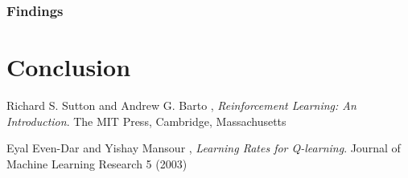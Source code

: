 \documentclass[11pt]{article}
\begin{document}
\subsubsection{Findings}

\section{Conclusion}

\begin{thebibliography}{9}

  Richard S. Sutton and Andrew G. Barto ,
  \emph{Reinforcement Learning: An Introduction}.
  The MIT Press, Cambridge, Massachusetts

  Eyal Even-Dar and Yishay Mansour ,
  \emph{Learning Rates for Q-learning}.
  Journal of Machine Learning Research 5 (2003)

\end{thebibliography}
\end{document}
